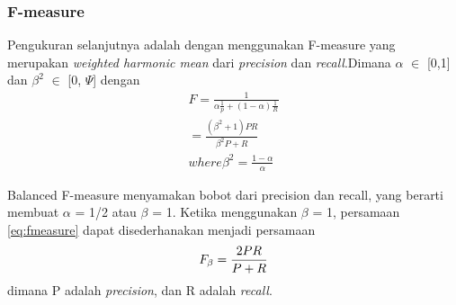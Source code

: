 \subsubsection*{F-measure}
Pengukuran selanjutnya adalah dengan menggunakan F-measure yang merupakan \textit{weighted harmonic mean} dari \textit{precision} dan \textit{recall}.Dimana $\alpha$ $\in$ [0,1] dan $\beta^2$ $\in$ [0, $\Psi$] dengan
\begin{equation}
\begin{split}
F = \frac{1}{\alpha \frac{1}{p} + (1 - \alpha)\frac{1}{R}} \\
= \frac{(\beta^2 + 1)PR}{\beta^2P + R} \\
where \beta^2 = \frac{1 - \alpha}{\alpha}
\label{eq:fmeasure}
\end{split}
\end{equation}


Balanced F-measure menyamakan bobot dari precision dan recall, yang berarti membuat $\alpha$ = 1/2 atau $\beta$ = 1. Ketika menggunakan $\beta$ = 1, persamaan \ref{eq:fmeasure} dapat disederhanakan  menjadi persamaan
\begin{equation}
\begin{split}
\tiny
F_\beta = \frac{2PR}{P + R}
\label{eq:fmeasuredua}
\normalsize
\end{split}
\end{equation}
dimana P adalah \textit{precision}, dan R adalah \textit{recall}.

